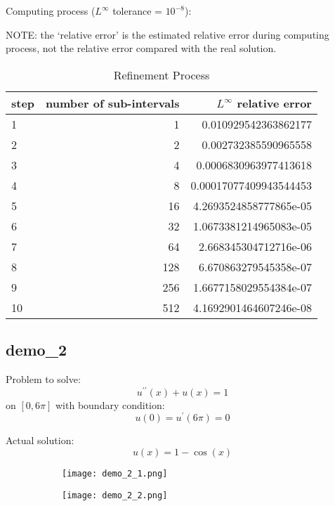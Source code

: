 \documentclass{article}
\begin{document}
Computing process ($L^\infty$ tolerance = $10^{-8}$):

NOTE: the `relative error' is the estimated relative error during 
computing process, not the relative error compared with the real solution.

\begin{table}[H]
    \centering
    \begin{tabular}{l|r|r}
        step & number of sub-intervals & $L^\infty$ relative error \\
        \hline
        1  &   1 & 0.010929542363862177 \\
        2  &   2 & 0.002732385590965558 \\
        3  &   4 & 0.0006830963977413618 \\
        4  &   8 & 0.00017077409943544453 \\
        5  &  16 & 4.2693524858777865e-05 \\
        6  &  32 & 1.0673381214965083e-05 \\
        7  &  64 & 2.668345304712716e-06 \\
        8  & 128 & 6.670863279545358e-07 \\
        9  & 256 & 1.6677158029554384e-07 \\
        10 & 512 & 4.1692901464607246e-08 \\
    \end{tabular}
    \caption{Refinement Process}
\end{table}


\subsection{demo\_2}

Problem to solve:
$$
    u^{\prime\prime}(x) + u(x) = 1
$$ on $[0, 6\pi]$
with boundary condition:
$$
    u(0) = u^\prime(6\pi) = 0
$$

Actual solution:
$$
    u(x) = 1 - \cos(x)
$$

\begin{figure}[H]
	\centering
	\begin{subfigure}[h]{0.45\linewidth}
	    \texttt{[image: demo\_2\_1.png]}
    \end{subfigure}
    \begin{subfigure}[h]{0.45\linewidth}
	    \texttt{[image: demo\_2\_2.png]}
    \end{subfigure}
\end{figure}
\end{document}
